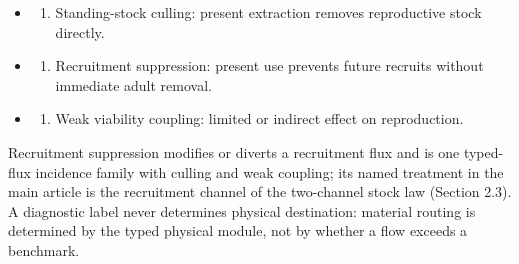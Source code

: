 \documentclass[
  10pt,
  a4paper,
]{article}
\providecommand{\tightlist}{%
  \setlength{\itemsep}{0pt}\setlength{\parskip}{0pt}}
\begin{document}
\begin{itemize}
\tightlist
\item
  \begin{enumerate}
  \def\labelenumi{(\roman{enumi})}
  \tightlist
  \item
    Standing-stock culling: present extraction removes reproductive
    stock directly.
  \end{enumerate}
\item
  \begin{enumerate}
  \def\labelenumi{(\roman{enumi})}
  \setcounter{enumi}{1}
  \tightlist
  \item
    Recruitment suppression: present use prevents future recruits
    without immediate adult removal.
  \end{enumerate}
\item
  \begin{enumerate}
  \def\labelenumi{(\roman{enumi})}
  \setcounter{enumi}{2}
  \tightlist
  \item
    Weak viability coupling: limited or indirect effect on reproduction.
  \end{enumerate}
\end{itemize}

Recruitment suppression modifies or diverts a recruitment flux and is
one typed-flux incidence family with culling and weak coupling; its
named treatment in the main article is the recruitment channel of the
two-channel stock law (Section 2.3). A diagnostic label never determines
physical destination: material routing is determined by the typed
physical module, not by whether a flow exceeds a benchmark.
\end{document}
